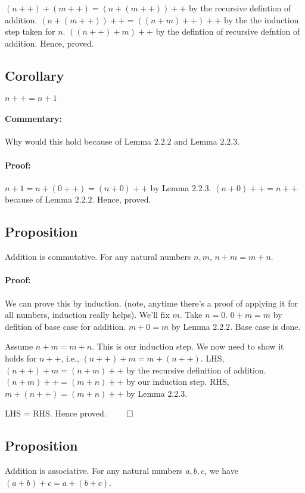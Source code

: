 \documentclass{report}
\begin{document}
$\left( n++ \right) + \left( m++ \right) = \left( n+\left( m++ \right)  \right) ++ $ by the recursive defintion of addition.
$\left( n + \left( m++ \right)  \right) ++ = \left( \left( n+m \right) ++ \right) ++ $ by the the induction step taken for $n$. 
$\left( \left( n++ \right) +m \right) ++$ by the defintion of recursive defntion of addition. Hence, proved. 

\subsection*{Corollary}
$n++ = n + 1 $ 
\paragraph{Commentary: }Why would this hold because of Lemma  $2.2.2$ and Lemma $2.2.3$. 

\paragraph{Proof:} $n+1 = n + \left( 0++ \right) = \left( n+0 \right) ++$ by Lemma $2.2.3$. $\left( n+0 \right) ++ = n++$ because of Lemma $2.2.2$. Hence, proved.

\subsection{Proposition} Addition is commutative. For any natural numbers $n,m$, $n+m = m+n$. 

\paragraph{Proof: } We can prove this by induction. (note, anytime there's a proof of applying it for all numbers, induction really helps). We'll fix $m$. Take  $n=0$. $0+m = m$ by defition of base case for addition. $m+0 = m$ by Lemma $2.2.2$. Base case is done.

Assume $n+m = m+n$. This is our induction step. We now need to show it holds for $n++$, i.e., $\left( n++ \right) + m = m + \left( n++ \right) $. 
LHS, $\left( n++ \right) + m = \left( n+m \right) ++	$ by the recursive definition of addition. $\left( n+m \right) ++ = \left( m+n \right) ++$ by our induction step.
RHS, $m+ \left( n++ \right) = \left( m+n \right)++ $ by Lemma $2.2.3$.

LHS = RHS. Hence proved. $\qed$

\subsection{Proposition} Addition is associative. For any natural numbers $a,b,c$, we have $(a+b)+c = a+\left( b+c \right) $.
\end{document}
